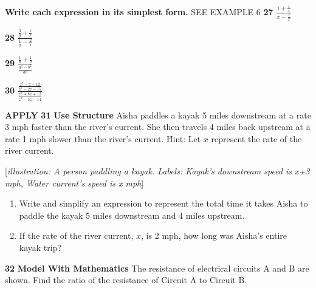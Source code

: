 \documentclass{article}
\newenvironment{practice}[2]{\textbf{#1}\quad}{\par}
\newcommand{\answer}[1]{}
\newcommand{\placeholder}[2]{[\textit{#1: #2}]}
\begin{document}
\textbf{Write each expression in its simplest form.} SEE EXAMPLE 6
\begin{practice}{27}{unknown}
$\frac{1 + \frac{1}{x}}{x - \frac{1}{x}}$
\answer{}
\end{practice}
\begin{practice}{28}{unknown}
$\frac{\frac{3}{y} + \frac{7}{x}}{\frac{1}{y} - \frac{2}{x}}$
\answer{}
\end{practice}
\begin{practice}{29}{unknown}
$\frac{\frac{1}{a} + \frac{1}{b}}{\frac{a^2 - b^2}{ab}}$
\answer{}
\end{practice}
\begin{practice}{30}{unknown}
$\frac{\frac{z^2 - z - 12}{z^2 - 2z - 15}}{\frac{z^2 + 8z + 12}{z^2 - 5z - 14}}$
\answer{}
\end{practice}

\textbf{APPLY}
\begin{practice}{31}{unknown}
\textbf{Use Structure} Aisha paddles a kayak 5 miles downstream at a rate 3 mph faster than the river's current. She then travels 4 miles back upstream at a rate 1 mph slower than the river's current. Hint: Let $x$ represent the rate of the river current.

\placeholder{illustration}{A person paddling a kayak. Labels: Kayak's downstream speed is x+3 mph, Water current's speed is x mph}

\begin{enumerate}
    \item[\textbf{a.}] Write and simplify an expression to represent the total time it takes Aisha to paddle the kayak 5 miles downstream and 4 miles upstream.
    \item[\textbf{b.}] If the rate of the river current, $x$, is 2 mph, how long was Aisha's entire kayak trip?
\end{enumerate}
\answer{}
\end{practice}

\begin{practice}{32}{unknown}
\textbf{Model With Mathematics} The resistance of electrical circuits A and B are shown. Find the ratio of the resistance of Circuit A to Circuit B.
\begin{center}
\end{center}
\answer{}
\end{practice}
\end{document}
